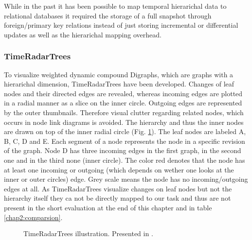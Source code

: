 While in the past it has been possible to map temporal hierarichal data to relational databases it required the storage of a full snapshot through foreign/primary key relations instead of just storing incremental or differential updates as well as the hierarichal mapping overhead.

\subsubsection{TimeRadarTrees\cite{vilanovatimeradartrees}} To visualize weighted dynamic compound Digraphs, which are graphs with a hierarichal dimension, TimeRadarTrees have been developed. Changes of leaf nodes and their directed edges are revealed, whereas incoming edges are plotted in a radial manner as a slice on the inner circle. Outgoing edges are represented by the outer thumbnails. Therefore visual clutter regarding related nodes, which occurs in node link diagrams is avoided. The hierarchy and thus the inner nodes are drawn on top of the inner radial circle (Fig. \ref{fig:timeradar}). The leaf nodes are labeled A, B, C, D and E. Each segment of a node represents the node in a specific revision of the graph. Node D has three incoming edges in the first graph, in the second one and in the third none (inner circle). The color red denotes that the node has at least one incoming or outgoing (which depends on wether one looks at the inner or outer circles) edge. Grey scale means the node has no incoming/outgoing edges at all. As TimeRadarTrees visualize changes on leaf nodes but not the hierarchy itself they ca not be directly mapped to our task and thus are not present in the short evaluation at the end of this chapter and in table \ref{chap2:comparsion}.

\begin{figure}[tb]
\caption{\label{fig:timeradar} TimeRadarTrees illustration. Presented in \cite{vilanovatimeradartrees}.}
\end{figure}

